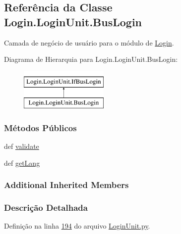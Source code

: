 \hypertarget{classLogin_1_1LoginUnit_1_1BusLogin}{\subsection{Referência da Classe Login.\-Login\-Unit.\-Bus\-Login}
\label{classLogin_1_1LoginUnit_1_1BusLogin}
}


Camada de negócio de usuário para o módulo de \hyperlink{namespaceLogin}{Login}.  


Diagrama de Hierarquia para Login.\-Login\-Unit.\-Bus\-Login\-:\begin{figure}[H]
\begin{center}
\leavevmode
\includegraphics[height=2.000000cm]{d9/d51/classLogin_1_1LoginUnit_1_1BusLogin}
\end{center}
\end{figure}
\subsubsection*{Métodos Públicos}
\begin{DoxyCompactItemize}
\item 
def \hyperlink{classLogin_1_1LoginUnit_1_1BusLogin_a2301425767b811697ce559801b955a58}{validate}
\item 
def \hyperlink{classLogin_1_1LoginUnit_1_1BusLogin_a23223ddd567bf874e6230efaf4912e98}{get\-Lang}
\end{DoxyCompactItemize}
\subsubsection*{Additional Inherited Members}


\subsubsection{Descrição Detalhada}


Definição na linha \hyperlink{LoginUnit_8py_source_l00194}{194} do arquivo \hyperlink{LoginUnit_8py_source}{Login\-Unit.\-py}.



